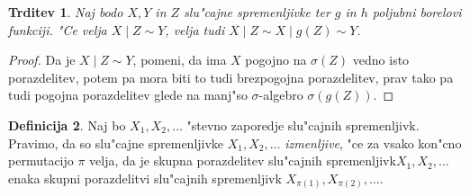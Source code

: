 \documentclass[12pt, a4paper, reqno]{amsart}
\theoremstyle{definition}
\newtheorem{definicija}{Definicija}[section]
\theoremstyle{plain}
\newtheorem{trditev}[definicija]{Trditev}
\newcommand{\Prob}{\mathbb{P}}
\newcommand{\1}{\mathds{1}}
\begin{document}

%

    \begin{trditev}
        Naj bodo $X, Y$ in $Z$ slu"cajne spremenljivke ter $g$ in $h$ poljubni borelovi funkciji. 
        "Ce velja $X\mid Z\sim Y$, velja tudi $X\mid Z\sim X\mid g(Z)\sim Y$.
        \label{trd:pogojneLastnosti}
    \end{trditev}

    \begin{proof}
        Da je $X\mid Z\sim Y$, pomeni, da ima $X$ pogojno na $\sigma(Z)$ vedno isto porazdelitev, potem pa mora
        biti to tudi brezpogojna porazdelitev, prav tako pa tudi pogojna porazdelitev glede
        na manj"so $\sigma$-algebro $\sigma(g(Z))$.
    \end{proof}

    \begin{definicija}
        Naj bo $X_1, X_2, \dots$ "stevno zaporedje slu"cajnih spremenljivk. Pravimo, da 
        so slu"cajne spremenljivke $X_1, X_2, \dots$ \textit{izmenljive}, "ce za vsako kon"cno 
        permutacijo $\pi$ velja, da je skupna porazdelitev slu"cajnih spremenljivk\newline $X_1, X_2, \dots$ enaka
        skupni porazdelitvi slu"cajnih spremenljivk $X_{\pi(1)}, X_{\pi(2)}, \dots$.
        \label{def:Izmenljivost}
    \end{definicija}
\end{document}

